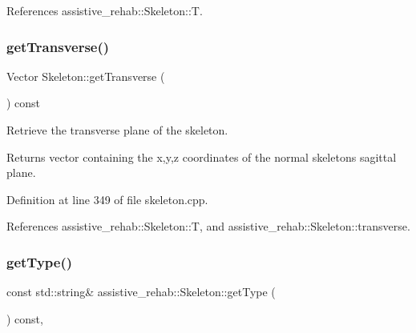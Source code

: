 References assistive\+\_\+rehab\+::\+Skeleton\+::T.

\mbox{\label{classassistive__rehab_1_1Skeleton_a35c3cdea575eb474a2cb8e0186011cff}} 
\subsubsection{\texorpdfstring{getTransverse()}{getTransverse()}}
{\footnotesize\ttfamily Vector Skeleton\+::get\+Transverse (\begin{DoxyParamCaption}{ }\end{DoxyParamCaption}) const\hspace{0.3cm}{\ttfamily [inherited]}}



Retrieve the transverse plane of the skeleton. 

\begin{DoxyReturn}{Returns}
vector containing the x,y,z coordinates of the normal skeleton\textquotesingle{}s sagittal plane. 
\end{DoxyReturn}


Definition at line 349 of file skeleton.\+cpp.


\begin{DoxyCode}{0}

\end{DoxyCode}


References assistive\+\_\+rehab\+::\+Skeleton\+::T, and assistive\+\_\+rehab\+::\+Skeleton\+::transverse.

\mbox{\label{classassistive__rehab_1_1Skeleton_a4efc4844bd2b185f1080ee52ab69cb04}} 
\subsubsection{\texorpdfstring{getType()}{getType()}}
{\footnotesize\ttfamily const std\+::string\& assistive\+\_\+rehab\+::\+Skeleton\+::get\+Type (\begin{DoxyParamCaption}{ }\end{DoxyParamCaption}) const\hspace{0.3cm}{\ttfamily [inline]}, {\ttfamily [inherited]}}



